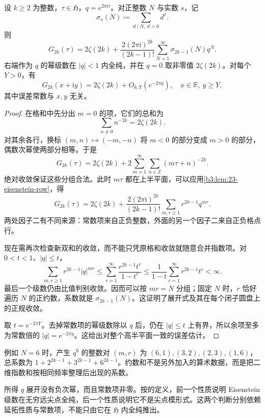 \begin{proposition}\label{b3:prop:23-eisenstein-fourier}
设 \(k\ge2\) 为整数，\(\tau\in\mathfrak H\)，\(q=e^{2\pi\mathrm{i}\tau}\)。对正整数 \(N\) 与实数 \(s\)，记
\[
 \sigma_s(N)\coloneqq\sum_{d\mid N,\ d>0}d^s.
\]
则
\begin{equation}\label{b3:eq:23-eisenstein-fourier}
 G_{2k}(\tau)=2\zeta(2k)
 +\frac{2(2\pi\mathrm{i})^{2k}}{(2k-1)!}
 \sum_{N=1}^{\infty}\sigma_{2k-1}(N)q^N.
\end{equation}
右端作为 \(q\) 的幂级数在 \(|q|<1\) 内全纯，并在 \(q=0\) 取非零值 \(2\zeta(2k)\)。对每个 \(Y>0\)，有
\[
 G_{2k}(x+\mathrm{i}y)=2\zeta(2k)+O_{k,Y}(e^{-2\pi y}),
 \quad x\in\mathbb R,\ y\ge Y,
\]
其中误差常数与 \(x,y\) 无关。
\end{proposition}
\begin{proof}
在格和中先分出 \(m=0\) 的项，它们的总和为
\[
 \sum_{n\ne0}n^{-2k}=2\zeta(2k).
\]
对其余各行，换标 \((m,n)\mapsto(-m,-n)\) 将 \(m<0\) 的部分变成 \(m>0\) 的部分，偶数次幂使两部分相等。于是
\[
 G_{2k}(\tau)=2\zeta(2k)
 +2\sum_{m=1}^{\infty}\sum_{n\in\mathbb Z}(m\tau+n)^{-2k}.
\]
绝对收敛保证这些分组合法。此时 \(m\tau\) 都在上半平面，可以应用\cref{b3:lem:23-eisenstein-row}，得
\[
 G_{2k}(\tau)=2\zeta(2k)
 +\frac{2(2\pi\mathrm{i})^{2k}}{(2k-1)!}
 \sum_{m,r\ge1}r^{2k-1}q^{mr}.
\]
两处因子二有不同来源：常数项来自正负整数，外面的另一个因子二来自正负格点行。

现在需再次检查新双和的收敛，而不能只凭原格和收敛就随意合并指数项。对 \(0<t<1\)、\(|q|\le t\)，
\[
 \sum_{m,r\ge1}r^{2k-1}|q|^{mr}
 \le\sum_{r=1}^{\infty}\frac{r^{2k-1}t^r}{1-t^r}
 \le\frac1{1-t}\sum_{r=1}^{\infty}r^{2k-1}t^r<\infty.
\]
最后一个级数仍由比值判别收敛。因而可以按 \(mr=N\) 分组；固定 \(N\) 时，\(r\) 恰好遍历 \(N\) 的正约数，系数就是 \(\sigma_{2k-1}(N)\)。这证明了展开式及其在每个闭子圆盘上的正规收敛。

取 \(t=e^{-2\pi Y}\)。去掉常数项的幂级数除以 \(q\) 后，仍在 \(|q|\le t\) 上有界，所以余项至多为常数倍的 \(|q|=e^{-2\pi y}\)。这给出对整个高半平面一致的误差估计。
\end{proof}

例如 \(N=6\) 时，产生 \(q^6\) 的整数对 \((m,r)\) 为 \((6,1),(3,2),(2,3),(1,6)\)，总系数为 \(1+2^{2k-1}+3^{2k-1}+6^{2k-1}\)。约数和不是另外加入的算术数据，而是把二维指数和按相同频率整理后出现的系数。

\ProseParagraphBreak

所得 \(q\) 展开没有负次幂，而且常数项非零。按的定义，前一个性质说明 Eisenstein 级数在无穷远尖点全纯，后一个性质说明它不是尖点模形式。这两个判断分别依赖延拓性质与常数项，不能只由它在 \(\mathfrak H\) 内全纯推出。

